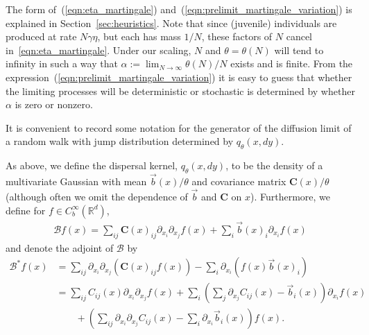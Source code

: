 \documentclass[EJP]{ejpecp} %
\newcommand{\IR}{\mathbb R}
\newcommand{\DG}{\mathcal{B}}  %
\newcommand{\meanq}{\vec b}    %
\newcommand{\covq}{\mathbf{C}}     %
\begin{document}
The form of~(\ref{eqn:eta_martingale}) and~(\ref{eqn:prelimit_martingale_variation})
is explained in Section~\ref{sec:heuristics}.
Note that since (juvenile) individuals are produced at rate $N \gamma \eta$, but each
has mass $1/N$,
these factors of $N$ cancel in~\eqref{eqn:eta_martingale}. 
Under our scaling, $N$ and $\theta=\theta(N)$ will tend to infinity in such a 
way that $\alpha:=\lim_{N\to\infty}\theta(N)/N$ exists and is finite.
From the expression~(\ref{eqn:prelimit_martingale_variation}) it is easy to guess that 
whether the limiting processes will be deterministic or stochastic
is determined by whether $\alpha$ is zero or nonzero.


It is convenient to record some notation for the 
generator of the diffusion 
limit of a random walk with jump distribution determined by $q_\theta(x,dy)$.

\begin{definition}
    \label{def:dispersal_generator}
    As above, we define the dispersal kernel,
    $q_\theta(x, dy)$,
    to be the density of a multivariate Gaussian
    with mean $\meanq(x)/\theta$ and covariance matrix $\covq(x)/\theta$
    (although often we omit the dependence of $\meanq$ and $\covq$ on $x$).
    Furthermore, we define for $f \in C_b^\infty(\IR^d)$,
    \begin{align}
    \DG f(x)
        =
        \sum_{ij} \covq(x)_{ij} \partial_{x_i} \partial_{x_j} f(x)
        + \sum_i \meanq(x)_i \partial_{x_i} f(x)
    \end{align}
    and denote the adjoint of $\DG$ by
    \begin{align*}
    \DG^* f(x)
        &=
        \sum_{ij} \partial_{x_i} \partial_{x_j} (\covq(x)_{ij} f(x))
        - \sum_i \partial_{x_i} (f(x) \meanq(x)_i) 
        \\
        &=
        \sum_{ij} C_{ij}(x) \partial_{x_i} \partial_{x_j} f(x)
        + \sum_i \left(
            \sum_j \partial_{x_j} C_{ij}(x) - \meanq_i(x)
        \right) \partial_{x_i} f(x)
        \\ & \qquad {}
        + \left(
            \sum_{ij} \partial_{x_i} \partial_{x_j} C_{ij}(x)
            -
            \sum_i \partial_{x_i} \meanq_i(x)
        \right) f(x) .
    \end{align*}
\end{definition}
\end{document}
